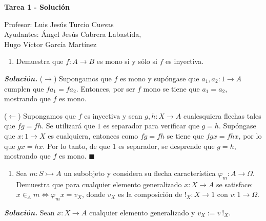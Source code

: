 \documentclass[12pt]{article}
\newcounter{A}
\newenvironment{ejercicio}{\begin{enumerate}[\bfseries \text{EJ \theA}.]\item}{\end{enumerate}\stepcounter{A}}
\newcommand{\QED}{\hfill\ensuremath{\blacksquare}}
\begin{document}
	\begin{center}
		\Huge \textbf{Tarea 1 - Solución}
	\end{center}
    \begin{flushright}
        \footnotesize Profesor: Luis Jesús Turcio Cuevas \\
		Ayudantes: Ángel Jesús Cabrera Labastida, \\
		Hugo Víctor García Martínez
	\end{flushright}
    \normalsize

    \begin{ejercicio}
        Demuestra que \(f\colon A\to B\) es mono si y sólo si \(f\) es inyectiva.
    \end{ejercicio}

    \textbf{\textit{Solución.}} (\(\to\)) Supongamos que \(f\) es mono y supóngase que \(a_1,a_2 \colon 1 \to A\) cumplen que \(fa_1 = fa_2\). Entonces, por ser \(f\) mono se tiene que \(a_1 = a_2\), mostrando que \(f\) es mono.

    (\(\leftarrow\)) Supongamos que \(f\) es inyectiva y sean \(g,h \colon X \to A\) cualesquiera flechas tales que \(fg = fh\). Se utilizará que \(1\) es separador para verificar que \(g=h\). Supóngase que \(x \colon 1 \to X\) es cualquiera, entonces como \(fg=fh\) se tiene que \(fgx = fhx\), por lo que \(gx = hx\). Por lo tanto, de que \(1\) es separador, se desprende que \(g=h\), mostrando que \(f\) es mono. \QED
    
    \begin{ejercicio}
        Sea \(m\colon S\rightarrowtail A\) un subobjeto y considera su flecha característica \(\varphi_m\colon A\to \Omega\). Demuestra que para cualquier elemento generalizado \(x\colon X\to A\) se satisface: \( x\in_A m \iff \varphi_m x = v_X \), donde \(v_X\) es la composición de \(!_X\colon X\to 1\) con \(v\colon 1\to \Omega\).
    \end{ejercicio}

    \textbf{\textit{Solución.}} Sean \(x: X \to A\) cualquier elemento generalizado y $v_X:=v \: !_X$.
\end{document}
